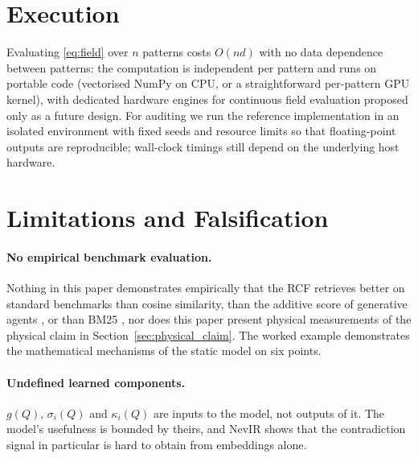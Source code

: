 \documentclass[11pt]{article}
\theoremstyle{remark}
\begin{document}
\begin{table}[htbp]
  \centering
  \caption{Concentration of squared distances $D$ from a random unit query to $2000$ random unit vectors, and the resulting dynamic range of the distance term in \eqref{eq:loglinear} ($\epsilon=0.1$).}
  \label{tab:concentration}
  
\end{table}

\section{Execution}
\label{sec:execution}

Evaluating \eqref{eq:field} over $n$ patterns costs $O(nd)$ with no data dependence between patterns: the computation is independent per pattern and runs on portable code (vectorised NumPy on CPU, or a straightforward per-pattern GPU kernel), with dedicated hardware engines for continuous field evaluation proposed only as a future design. For auditing we run the reference implementation in an isolated environment with fixed seeds and resource limits so that floating-point outputs are reproducible; wall-clock timings still depend on the underlying host hardware.

\section{Limitations and Falsification}
\label{sec:limits}

\paragraph{No empirical benchmark evaluation.}
Nothing in this paper demonstrates empirically that the RCF retrieves better on standard benchmarks than cosine similarity, than the additive score of generative agents \citep{park2023generative}, or than BM25 \citep{robertson2009bm25}, nor does this paper present physical measurements of the physical claim in Section~\ref{sec:physical_claim}. The worked example demonstrates the mathematical mechanisms of the static model on six points.

\paragraph{Undefined learned components.}
$g(Q)$, $\sigma_i(Q)$ and $\kappa_i(Q)$ are inputs to the model, not outputs of it. The model's usefulness is bounded by theirs, and NevIR \citep{weller2024nevir} shows that the contradiction signal in particular is hard to obtain from embeddings alone.
\end{document}

